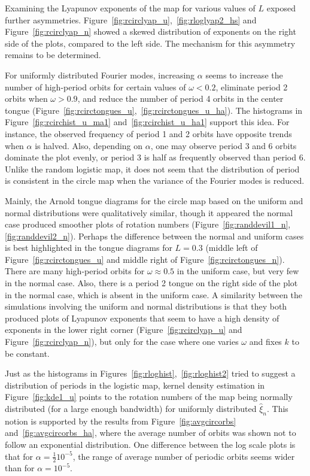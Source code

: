 Examining the Lyapunov exponents of the map
for various values of $L$ exposed further asymmetries. Figure~\ref{fig:rcirclyap_u},~\ref{fig:rloglyap2_hs}
and Figure~\ref{fig:rcirclyap_n} showed a skewed distribution of
exponents on the right side of the plots, compared to the left
side. The mechanism for this asymmetry remains to be determined.

For uniformly distributed Fourier modes, increasing $\alpha$ seems to increase the number of
high-period orbits for certain values of $\omega < 0.2$, eliminate period
2 orbits when $\omega >0.9$, and reduce the number of period 4 orbits
in the center tongue
(Figure~\ref{fig:rcirctongues_u},~\ref{fig:rcirctongues_u_ha}). The
histograms in Figure~\ref{fig:rcirchist_u_ma1} and~\ref{fig:rcirchist_u_ha1} support this idea. For
instance, the observed frequency of
period 1 and 2 orbits have opposite trends when $\alpha$ is
halved. Also, depending on $\alpha$, one may observe period 3 and 6 orbits dominate the plot evenly, or period 3 is half as frequently observed than
period 6. Unlike the random logistic map, it does not seem that the
distribution of period is consistent in the circle map when the
variance of the Fourier modes is reduced.  

Mainly, the Arnold tongue diagrams for the circle map based on the uniform and
normal distributions were qualitatively similar, though it appeared the normal
case produced smoother plots of rotation numbers
(Figure~\ref{fig:randdevil1_n}, \ref{fig:randdevil2_n}). Perhaps the
difference between the normal and uniform cases is best highlighted in
the tongue diagrams for $L = 0.3$ (middle left of
Figure~\ref{fig:rcirctongues_u} and middle right of
Figure~\ref{fig:rcirctongues_n}). There are many high-period orbits
for $\omega\approx 0.5$ in the uniform case, but very
few in the normal case. Also, there is a period 2 tongue on the right
side of the plot in the normal case, which is absent in the uniform
case. A similarity between the simulations involving the uniform and normal
distributions is that they both produced plots of Lyapunov exponents that seem to have a
high density of exponents in the lower right corner
(Figure~\ref{fig:rcirclyap_u} and Figure~\ref{fig:rcirclyap_n}), but
only for the case where one varies $\omega$ and fixes $k$ to be
constant.

Just as the histograms in Figures~\ref{fig:rloghist},~\ref{fig:rloghist2} tried to suggest a
distribution of periods in the logistic map, kernel density estimation
in Figure~\ref{fig:kde1_u} points to the rotation numbers of the map
being normally distributed (for a large enough bandwidth) for
uniformly distributed $\hat{\xi}_n$. This notion is supported by the
results from Figure~\ref{fig:avgcircorbs} and~\ref{fig:avgcircorbs_ha}, where the average number of orbits was shown not to follow an exponential
distribution. One difference between the log scale plots is that for $\alpha=\frac{1}{2}10^{-5}$, the range
of average number of periodic orbits seems wider than for
$\alpha=10^{-5}$. 


